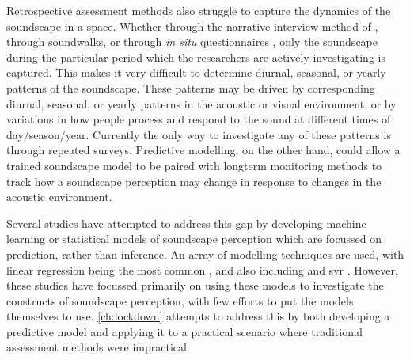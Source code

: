 Retrospective assessment methods also struggle to capture the dynamics of the soundscape in a space. Whether through the narrative interview method of \citet[Sec. 5.4]{ISO12913Part2}, through soundwalks, or through \textit{in situ} questionnaires \citep{Mitchell2020Soundscape}, only the soundscape during the particular period which the researchers are actively investigating is captured. This makes it very difficult to determine diurnal, seasonal, or yearly patterns of the soundscape. These patterns may be driven by corresponding diurnal, seasonal, or yearly patterns in the acoustic or visual environment, or by variations in how people process and respond to the sound at different times of day/season/year. Currently the only way to investigate any of these patterns is through repeated surveys. Predictive modelling, on the other hand, could allow a trained soundscape model to be paired with longterm monitoring methods to track how a soundscape perception may change in response to changes in the acoustic environment.

Several studies have attempted to address this gap by developing machine learning or statistical models of soundscape perception which are focussed on prediction, rather than inference. An array of modelling techniques are used, with linear regression being the most common \citep{Lionello2020systematic}, and also including  \citep{Yu2009Modeling,PuyanaRomero2016Modelling} and \gls{svr} \citep{Giannakopoulos2019Athens,Fan2016Automatic,Fan2017Emo}. However, these studies have focussed primarily on using these models to investigate the constructs of soundscape perception, with few efforts to put the models themselves to use. \cref{ch:lockdown} attempts to address this by both developing a predictive model and applying it to a practical scenario where traditional assessment methods were impractical.

